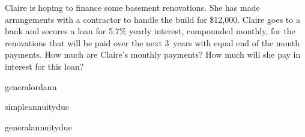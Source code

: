 \documentclass[11pt,letterpaper]{article}
\begin{document}

 Claire is hoping to finance some basement renovations. She has made arrangements with a contractor to handle the build for \$12,000. Claire goes to a bank and secures a loan for 5.7\% yearly interest, compounded monthly, for the renovations that will be paid over the next 3~years with equal end of the month payments. How much are Claire's monthly payments? How much will she pay in interest for this loan? 



\newpage



 generalordann

 simpleannuitydue

 generalannuitydue
\end{document}
